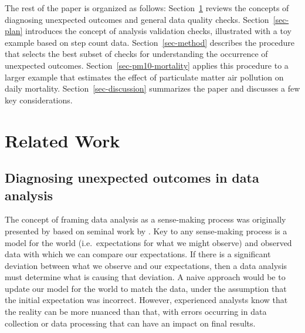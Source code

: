 \documentclass[
  12pt,
]{interact}
\begin{document}
The rest of the paper is organized as follows:
Section~\ref{sec-lit-review} reviews the concepts of diagnosing
unexpected outcomes and general data quality checks.
Section~\ref{sec-plan} introduces the concept of analysis validation
checks, illustrated with a toy example based on step count data.
Section~\ref{sec-method} describes the procedure that selects the best
subset of checks for understanding the occurrence of unexpected
outcomes. Section~\ref{sec-pm10-mortality} applies this procedure to a
larger example that estimates the effect of particulate matter air
pollution on daily mortality. Section~\ref{sec-discussion} summarizes
the paper and discusses a few key considerations.

\section{Related Work}\label{sec-lit-review}

\subsection{Diagnosing unexpected outcomes in data
analysis}\label{diagnosing-unexpected-outcomes-in-data-analysis}

The concept of framing data analysis as a sense-making process was
originally presented by \citet{grolemund_cognitive_2014} based on
seminal work by \citet{wild1999statistical}. Key to any sense-making
process is a model for the world (i.e.~expectations for what we might
observe) and observed data with which we can compare our expectations.
If there is a significant deviation between what we observe and our
expectations, then a data analysis must determine what is causing that
deviation. A naive approach would be to update our model for the world
to match the data, under the assumption that the initial expectation was
incorrect. However, experienced analysts know that the reality can be
more nuanced than that, with errors occurring in data collection or data
processing that can have an impact on final results.
\end{document}
